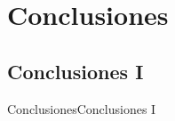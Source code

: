 \section{Conclusiones}

\subsection*{Conclusiones I}

\begin{frame}{Conclusiones}{Conclusiones I}

\end{frame}
